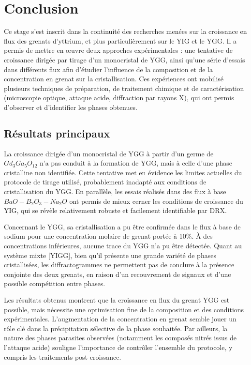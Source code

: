 \documentclass{rapportENSCP}
\begin{document}
\section{Conclusion}
Ce stage s’est inscrit dans la continuité des recherches menées sur la croissance en flux des grenats d’yttrium, et plus particulièrement sur le YIG et le YGG. Il a permis de mettre en œuvre deux approches expérimentales : une tentative de croissance dirigée par tirage d’un monocristal de YGG, ainsi qu’une série d’essais dans différents flux afin d’étudier l’influence de la composition et de la concentration en grenat sur la cristallisation. Ces expériences ont mobilisé plusieurs techniques de préparation, de traitement chimique et de caractérisation (microscopie optique, attaque acide, diffraction par rayons X), qui ont permis d’observer et d’identifier les phases obtenues.

\subsection*{Résultats principaux}

La croissance dirigée d’un monocristal de YGG à partir d’un germe de $Gd_3Ga_5O_{12}$ n’a pas conduit à la formation de YGG, mais à celle d’une phase cristalline non identifiée. Cette tentative met en évidence les limites actuelles du protocole de tirage utilisé, probablement inadapté aux conditions de cristallisation du YGG. En parallèle, les essais réalisés dans des flux à base $BaO-B_2O_3-Na_2O$ ont permis de mieux cerner les conditions de croissance du YIG, qui se révèle relativement robuste et facilement identifiable par DRX.

Concernant le YGG, sa cristallisation a pu être confirmée dans le flux à base de sodium pour une concentration molaire de grenat portée à 10\%.  À des concentrations inférieures, aucune trace du YGG n’a pu être détectée. Quant au système mixte [YIGG], bien qu’il présente une grande variété de phases cristallisées, les diffractogrammes ne permettent pas de conclure à la présence conjointe des deux grenats, en raison d’un recouvrement de signaux et d’une possible compétition entre phases.

Les résultats obtenus montrent que la croissance en flux du grenat YGG est possible, mais nécessite une optimisation fine de la composition et des conditions expérimentales. L’augmentation de la concentration en grenat semble jouer un rôle clé dans la précipitation sélective de la phase souhaitée. Par ailleurs, la nature des phases parasites observées (notamment les composés nitrés issus de l’attaque acide) souligne l’importance de contrôler l’ensemble du protocole, y compris les traitements post-croissance.
\end{document}
